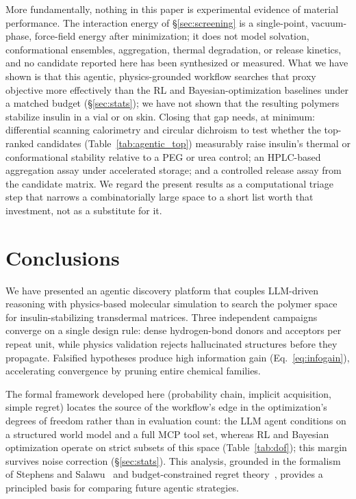 \documentclass[twocolumn]{fairmeta}
\begin{document}
More fundamentally, nothing in this paper is experimental evidence of material performance.
The interaction energy of \S\ref{sec:screening} is a single-point, vacuum-phase, force-field energy after minimization; it does not model solvation, conformational ensembles, aggregation, thermal degradation, or release kinetics, and no candidate reported here has been synthesized or measured.
What we have shown is that this agentic, physics-grounded workflow searches that proxy objective more effectively than the RL and Bayesian-optimization baselines under a matched budget (\S\ref{sec:stats}); we have not shown that the resulting polymers stabilize insulin in a vial or on skin.
Closing that gap needs, at minimum: differential scanning calorimetry and circular dichroism to test whether the top-ranked candidates (Table~\ref{tab:agentic_top}) measurably raise insulin's thermal or conformational stability relative to a PEG or urea control; an HPLC-based aggregation assay under accelerated storage; and a controlled release assay from the candidate matrix.
We regard the present results as a computational triage step that narrows a combinatorially large space to a short list worth that investment, not as a substitute for it.

\section{Conclusions}

We have presented an agentic discovery platform that couples LLM-driven reasoning with physics-based molecular simulation to search the polymer space for insulin-stabilizing transdermal matrices.
Three independent campaigns converge on a single design rule: dense hydrogen-bond donors and acceptors per repeat unit, while physics validation rejects hallucinated structures before they propagate.
Falsified hypotheses produce high information gain (Eq.~\ref{eq:infogain}), accelerating convergence by pruning entire chemical families.

The formal framework developed here (probability chain, implicit acquisition, simple regret) locates the source of the workflow's edge in the optimization's degrees of freedom rather than in evaluation count: the LLM agent conditions on a structured world model and a full MCP tool set, whereas RL and Bayesian optimization operate on strict subsets of this space (Table~\ref{tab:dof}); this margin survives noise correction (\S\ref{sec:stats}).
This analysis, grounded in the formalism of Stephens and Salawu~\cite{stephens2025mathframing} and budget-constrained regret theory~\cite{shahriari2016bayesopt}, provides a principled basis for comparing future agentic strategies.
\end{document}
